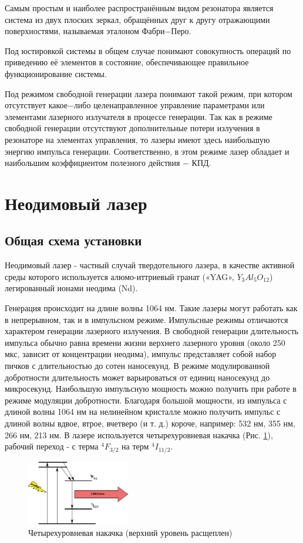 \documentclass[twocolumn]{article}
\begin{document}
Самым простым и наиболее распространённым видом резонатора является система из
двух плоских зеркал, обращённых друг к другу отражающими поверхностями,
называемая эталоном Фабри−Перо. 

Под юстировкой системы в общем случае
понимают совокупность операций по приведению её элементов в состояние,
обеспечивающее правильное функционирование системы.

Под режимом свободной генерации лазера понимают такой режим, при котором
отсутствует какое−либо целенаправленное управление параметрами или
элементами лазерного излучателя в процессе генерации. Так как в режиме
свободной генерации отсутствуют дополнительные потери излучения в
резонаторе на элементах управления, то лазеры имеют здесь наибольшую
энергию импульса генерации. Соответственно, в этом режиме лазер обладает
и наибольшим коэффициентом полезного действия − КПД. 
\section{Неодимовый лазер}
\subsection{Общая схема установки}

Неодимовый лазер - частный случай твердотельного лазера, в качестве активной среды которого используется  алюмо-иттриевый гранат («YAG», $Y_3Al_5O_{12}$) легированный ионами неодима (Nd).

Генерация происходит на длине волны 1064 нм. Такие лазеры могут работать как в непрерывном, так и в импульсном режиме. Импульсные режимы отличаются характером генерации лазерного излучения. В свободной генерации длительность импульса обычно равна времени жизни верхнего лазерного уровня (около 250 мкс, зависит от концентрации неодима), импульс представляет собой набор пичков с длительностью до сотен наносекунд. В режиме модулированной добротности длительность может варьироваться от единиц наносекунд до микросекунд. Наибольшую импульсную мощность можно получить при работе в режиме модуляции добротности. Благодаря большой мощности, из импульса с длиной волны 1064 нм на нелинейном кристалле можно получить импульс с длиной волны вдвое, втрое, вчетверо (и т. д.) короче, например: 532 нм, 355 нм, 266 нм, 213 нм. В лазере используется четырехуровневая накачка (Рис. \ref{fig:levels}), рабочий переход - с терма $^4F_{3/2}$ на терм $^4I_{11/2}$.

\begin{figure}
\centering
\includegraphics[width=0.4\textwidth]{LEMPH Report_files/levels.png}
\caption{Четырехуровневая накачка (верхний уровень расщеплен) \label{fig:levels}}

\end{figure}
\end{document}
